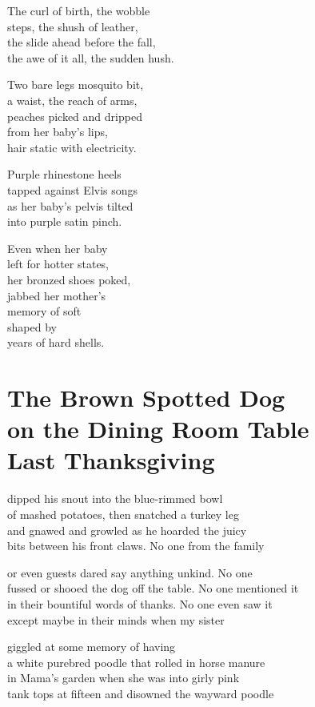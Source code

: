 \documentclass[twoside,10pt]{book}
\begin{document}
The curl of birth, the wobble\\
steps, the shush of leather,\\
the slide ahead before the fall,\\
the awe of it all, the sudden hush.

Two bare legs mosquito bit,\\
a waist, the reach of arms,\\
peaches picked and dripped\\
from her baby's lips,\\
hair static with electricity.

Purple rhinestone heels\\
tapped against Elvis songs\\
as her baby's pelvis tilted\\
into purple satin pinch.

Even when her baby\\
left for hotter states,\\
her bronzed shoes poked,\\
jabbed her mother's\\
memory of soft\\
shaped by\\
years of hard shells.


\clearpage
\section{The Brown Spotted Dog\\
  on the Dining Room Table\\
  Last Thanksgiving}

dipped his snout into the blue-rimmed bowl\\
of mashed potatoes, then snatched a turkey leg\\
and gnawed and growled as he hoarded the juicy\\
bits between his front claws. No one from the family

or even guests dared say anything unkind. No one\\
fussed or shooed the dog off the table. No one mentioned it\\
in their bountiful words of thanks. No one even saw it\\
except maybe in their minds when my sister

giggled at some memory of having\\
a white purebred poodle that rolled in horse manure\\
in Mama's garden when she was into girly pink\\
tank tops at fifteen and disowned the wayward poodle
\end{document}
